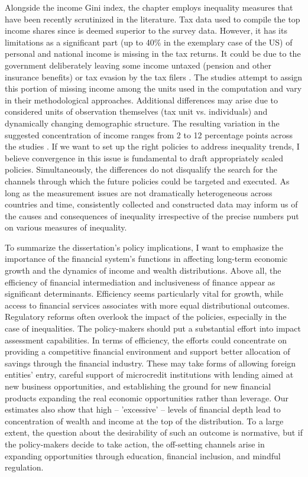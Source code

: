 \begin{refsection}
Alongside the income Gini index, the chapter employs inequality measures that have been recently scrutinized in the literature. Tax data used to compile the top income shares since \textcite{piketty2003income} is deemed superior to the survey data. However, it has its limitations as a significant part (up to 40\% in the exemplary case of the US) of personal and national income is missing in the tax returns. It could be due to the government deliberately leaving some income untaxed (pension and other insurance benefits) or tax evasion by the tax filers \parencite{johns2010distribution, alstadsaeter2019tax}. The studies attempt to assign this portion of missing income among the units used in the computation and vary in their methodological approaches. Additional differences may arise due to considered units of observation themselves (tax unit vs. individuals) and dynamically changing demographic structure. The resulting variation in the suggested concentration of income ranges from 2 to 12 percentage points across the studies \parencite{auten2019top}. If we want to set up the right policies to address inequality trends, I believe convergence in this issue is fundamental to draft appropriately scaled policies. Simultaneously, the differences do not disqualify the search for the channels through which the future policies could be targeted and executed. As long as the measurement issues are not dramatically heterogeneous across countries and time, consistently collected and constructed data may inform us of the causes and consequences of inequality irrespective of the precise numbers put on various measures of inequality.

To summarize the dissertation's policy implications, I want to emphasize the importance of the financial system's functions in affecting long-term economic growth and the dynamics of income and wealth distributions. Above all, the efficiency of financial intermediation and inclusiveness of finance appear as significant determinants. Efficiency seems particularly vital for growth, while access to financial services associates with more equal distributional outcomes. Regulatory reforms often overlook the impact of the policies, especially in the case of inequalities. The policy-makers should put a substantial effort into impact assessment capabilities. In terms of efficiency, the efforts could concentrate on providing a competitive financial environment and support better allocation of savings through the financial industry. These may take forms of allowing foreign entities' entry, careful support of microcredit institutions with lending aimed at new business opportunities, and establishing the ground for new financial products expanding the real economic opportunities rather than leverage. Our estimates also show that high -- 'excessive' -- levels of financial depth lead to concentration of wealth and income at the top of the distribution. To a large extent, the question about the desirability of such an outcome is normative, but if the policy-makers decide to take action, the off-setting channels arise in expanding opportunities through education, financial inclusion, and mindful regulation.


\end{refsection}
